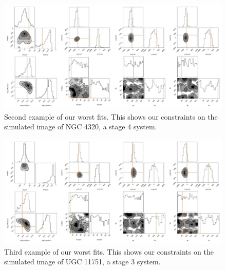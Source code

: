 \begin{figure}
\centering
\includegraphics[width=\textwidth]{Chapter1/figures/Arp57-red-corner.pdf}
\caption[Second example of our worst fits.]{Second example of our worst fits. This shows our constraints on the simulated image of NGC 4320, a stage 4 system.}
\label{fig:worst-Arp57}
\end{figure}

\begin{figure}
\centering
\includegraphics[width=\textwidth]{Chapter1/figures/UGC11751-red-corner.pdf}
\caption[Third example of our worst fits.]{Third example of our worst fits. This shows our constraints on the simulated image of UGC 11751, a stage 3 system.}
\label{fig:worst-UGC11751}
\end{figure}

